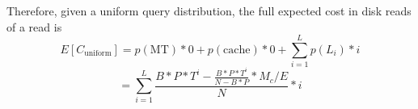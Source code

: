 \documentclass{sig-alternate-05-2015}
\begin{document}
Therefore, given a uniform query distribution, the full expected cost in disk reads of a read is
$$E[C_{\text{uniform}}] = p(\text{MT}) * 0  + p(\text{cache}) * 0 + \sum_{i=1}^L p(L_i) * i$$
$$=\sum_{i=1}^L \frac{B*P * T^i - \frac{B*P*T^i}{N-B*P} * M_c/E}{N} * i$$

%
%
%
%
%
\end{document}
